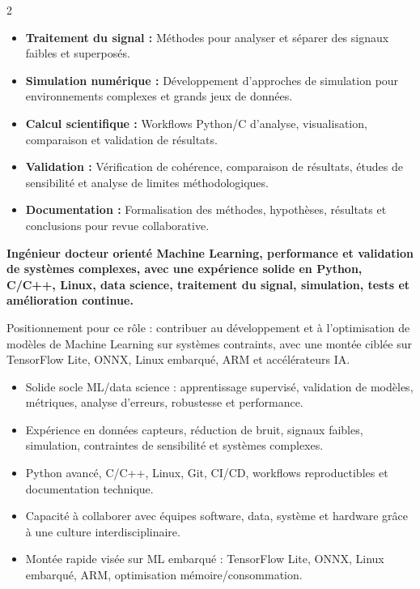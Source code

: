 \documentclass[8pt,a4paper,ragged2e,withhyper]{altacv}
\begin{document}
\begin{paracol}{2}
\begin{itemize}
  \item \textbf{Traitement du signal :} Méthodes pour analyser et séparer des signaux faibles et superposés.
  \item \textbf{Simulation numérique :} Développement d’approches de simulation pour environnements complexes et grands jeux de données.
  \item \textbf{Calcul scientifique :} Workflows Python/C d’analyse, visualisation, comparaison et validation de résultats.
  \item \textbf{Validation :} Vérification de cohérence, comparaison de résultats, études de sensibilité et analyse de limites méthodologiques.
  \item \textbf{Documentation :} Formalisation des méthodes, hypothèses, résultats et conclusions pour revue collaborative.
\end{itemize}

\switchcolumn


\textbf{Ingénieur docteur orienté Machine Learning, performance et validation de systèmes complexes, avec une expérience solide en Python, C/C++, Linux, data science, traitement du signal, simulation, tests et amélioration continue.}

Positionnement pour ce rôle : contribuer au développement et à l’optimisation de modèles de Machine Learning sur systèmes contraints, avec une montée ciblée sur TensorFlow Lite, ONNX, Linux embarqué, ARM et accélérateurs IA.

\begin{itemize}
  \item Solide socle ML/data science : apprentissage supervisé, validation de modèles, métriques, analyse d’erreurs, robustesse et performance.
  \item Expérience en données capteurs, réduction de bruit, signaux faibles, simulation, contraintes de sensibilité et systèmes complexes.
  \item Python avancé, C/C++, Linux, Git, CI/CD, workflows reproductibles et documentation technique.
  \item Capacité à collaborer avec équipes software, data, système et hardware grâce à une culture interdisciplinaire.
  \item Montée rapide visée sur ML embarqué : TensorFlow Lite, ONNX, Linux embarqué, ARM, optimisation mémoire/consommation.
\end{itemize}


\end{paracol}
\end{document}
